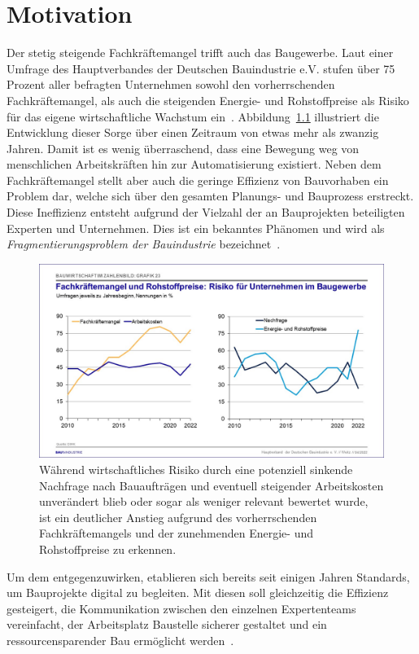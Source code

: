 \chapter{Motivation}\label{motivation}
Der stetig steigende Fachkräftemangel trifft auch das Baugewerbe. 
Laut einer Umfrage des Hauptverbandes der Deutschen Bauindustrie e.V. stufen über 75 Prozent aller befragten Unternehmen sowohl den vorherrschenden Fachkräftemangel, als auch die steigenden Energie- und Rohstoffpreise als Risiko für das eigene wirtschaftliche Wachstum ein~\cite{Bauindustrie:online}.
Abbildung~\ref{fig:Fachkraeftemangel} illustriert die Entwicklung dieser Sorge über einen Zeitraum von etwas mehr als zwanzig Jahren.
Damit ist es wenig überraschend, dass eine Bewegung weg von menschlichen Arbeitskräften hin zur Automatisierung existiert.
Neben dem Fachkräftemangel stellt aber auch die geringe Effizienz von Bauvorhaben ein Problem dar, welche sich über den gesamten Planungs- und Bauprozess erstreckt. 
Diese Ineffizienz entsteht aufgrund der Vielzahl der an Bauprojekten beteiligten Experten und Unternehmen.
Dies ist ein bekanntes Phänomen und wird als \textit{Fragmentierungsproblem der Bauindustrie} bezeichnet~\cite{ConstructionFragmentation}.
\begin{figure}[h]
    \centering
    \includegraphics[width=0.7\columnwidth]{fig/Grafik_23.jpg}
    \caption{Während wirtschaftliches Risiko durch eine potenziell sinkende Nachfrage nach Bauaufträgen und eventuell steigender Arbeitskosten unverändert blieb oder sogar als weniger relevant bewertet wurde, ist ein deutlicher Anstieg aufgrund des vorherrschenden Fachkräftemangels und der zunehmenden Energie- und Rohstoffpreise zu erkennen.}\label{fig:Fachkraeftemangel}
\end{figure}
Um dem entgegenzuwirken, etablieren sich bereits seit einigen Jahren Standards, um Bauprojekte digital zu begleiten.
Mit diesen soll gleichzeitig die Effizienz gesteigert, die Kommunikation zwischen den einzelnen Expertenteams vereinfacht, der Arbeitsplatz \glqq{}Baustelle\grqq{} sicherer gestaltet und ein ressourcensparender Bau ermöglicht werden~\cite{BIMforHe12:online}\cite{Top10Ben31:online}.
